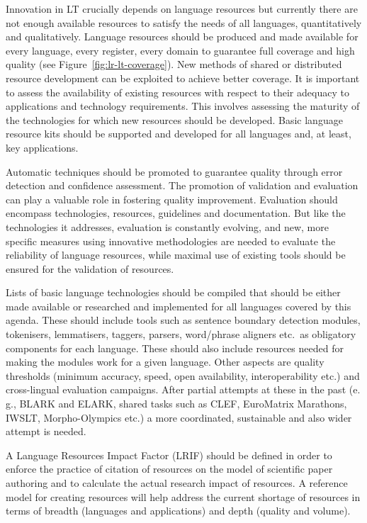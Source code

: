 \documentclass[10pt, plain]{../../metanetpaper}
\begin{document}
\begin{multicols}{2}
Innovation in LT crucially depends on language resources but currently there are not enough available resources to satisfy the needs of all languages, quantitatively and qualitatively. Language resources should be produced and made available for every language, every register, every domain to guarantee full coverage and high quality (see Figure~\ref{fig:lr-lt-coverage}). New methods of shared or distributed resource development can be exploited to achieve better coverage. It is important to assess the availability of existing resources with respect to their adequacy to applications and technology requirements. This involves assessing the maturity of the technologies for which new resources should be developed. Basic language resource kits should be supported and developed for all languages and, at least, key applications.

Automatic techniques should be promoted to guarantee quality through error detection and confidence assessment. The promotion of validation and evaluation can play a valuable role in fostering quality improvement. Evaluation should encompass technologies, resources, guidelines and documentation. But like the technologies it addresses, evaluation is constantly evolving, and new, more specific measures using innovative methodologies are needed to evaluate the reliability of language resources, while maximal use of existing tools should be ensured for the validation of resources.

Lists of basic language technologies should be compiled that should be either made available or researched and implemented for all languages covered by this agenda. These should include tools such as sentence boundary detection modules, tokenisers, lemmatisers, taggers, parsers, word/phrase aligners etc.~as obligatory components for each language. These should also include resources needed for making the modules work for a given language. Other aspects are quality thresholds (minimum accuracy, speed, open availability, interoperability etc.) and cross-lingual evaluation campaigns. After partial attempts at these in the past (e.\,g., BLARK and ELARK, shared tasks such as CLEF, EuroMatrix Marathons, IWSLT, Morpho-Olympics etc.) a more coordinated, sustainable and also wider attempt is needed. 

A Language Resources Impact Factor (LRIF) should be defined in order to enforce the practice of citation of resources on the model of scientific paper authoring and to calculate the actual research impact of resources.  A reference model for creating resources will help address the current shortage of resources in terms of breadth (languages and applications) and depth (quality and volume).


\end{multicols}
\end{document}
